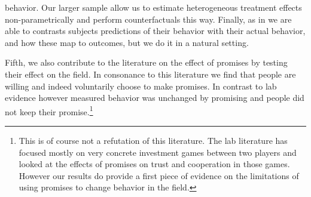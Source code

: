 \documentclass[oneside,11pt]{article}
\begin{document}
behavior. Our larger sample allow us to estimate heterogeneous treatment effects non-parametrically and perform counterfactuals this way. Finally, as in \cite{Rabin2018} we are able to contrasts subjects predictions of their behavior with their actual behavior, and how these map to outcomes, but we do it in a natural setting.

Fifth, we also contribute to the literature on the effect of promises by testing their effect on the field. In consonance to this literature we find that people are willing and indeed voluntarily choose to make promises. In contrast to lab evidence however measured behavior was unchanged by promising and people did not keep their promise.\footnote{This is of course not a refutation of this literature. %
The lab literature has focused mostly on very concrete investment games between two players and looked at the effects of promises on trust and cooperation in those games. However our results do provide a first piece of evidence on the limitations of using promises to change behavior in the field.}



\end{document}
